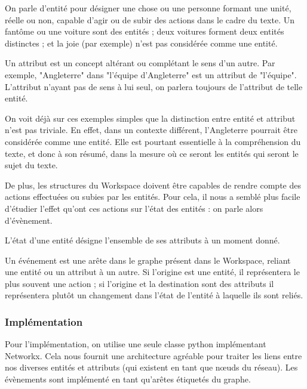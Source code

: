 \documentclass[a4paper, 12pt]{article}
\begin{document}
\begin{definition}[Entité]
On parle d'entité pour désigner une chose ou une personne formant une unité, réelle ou non, capable d'agir ou de subir des actions dans le cadre du texte. Un fantôme ou une voiture sont des entités ; deux voitures forment deux entités distinctes ; et la joie (par exemple) n'est pas considérée comme une entité.
\end{definition}
\begin{definition}[Attribut]
Un attribut est un concept altérant ou complétant le sens d'un autre. Par exemple, "Angleterre" dans "l'équipe d'Angleterre" est un attribut de "l'équipe". L'attribut n'ayant pas de sens à lui seul, on parlera toujours de l'attribut de telle entité.
\end{definition}

On voit déjà sur ces exemples simples que la distinction entre entité et attribut n'est pas triviale. En effet, dans un contexte différent, l'Angleterre pourrait être considérée comme une entité. Elle est pourtant essentielle à la compréhension du texte, et donc à son résumé, dans la mesure où ce seront les entités qui seront le sujet du texte.

De plus, les structures du Workspace doivent être capables de rendre compte des actions effectuées ou subies par les entités. Pour cela, il nous a semblé plus facile d'étudier l'effet qu'ont ces actions sur l'état des entités : on parle alors d'évènement.

\begin{definition}[État]
L'état d'une entité désigne l'ensemble de ses attributs à un moment donné.
\end{definition}
\begin{definition}[Évènement]
Un événement est une arête dans le graphe présent dans le Workspace, reliant une entité ou un attribut à un autre. Si l'origine est une entité, il représentera le plus souvent une action ; si l'origine et la destination sont des attributs il représentera plutôt un changement dans l'état de l'entité à laquelle ils sont reliés.
\end{definition}

\subsubsection{Implémentation}

Pour l'implémentation, on utilise une seule classe python implémentant Networkx. Cela nous fournit une architecture agréable pour traiter les liens entre nos diverses entités et attributs (qui existent en tant que nœuds du réseau). Les évènements sont implémenté en tant qu'arêtes étiquetés du graphe.
\end{document}
